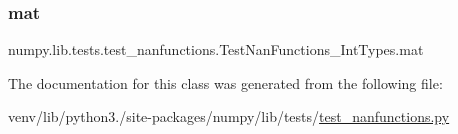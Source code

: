 \subsubsection{\texorpdfstring{mat}{mat}}
{\footnotesize\ttfamily numpy.\+lib.\+tests.\+test\+\_\+nanfunctions.\+Test\+Nan\+Functions\+\_\+\+Int\+Types.\+mat\hspace{0.3cm}{\ttfamily [static]}}



The documentation for this class was generated from the following file\+:\begin{DoxyCompactItemize}
\item 
venv/lib/python3./site-\/packages/numpy/lib/tests/\hyperlink{test__nanfunctions_8py}{test\+\_\+nanfunctions.\+py}\end{DoxyCompactItemize}

